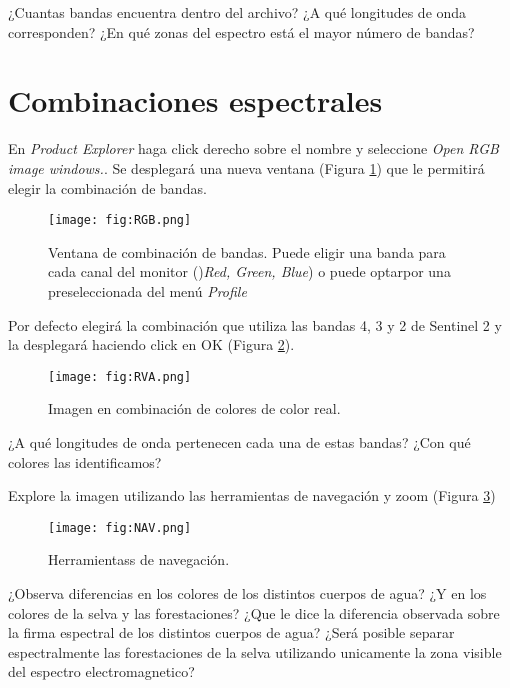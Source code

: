 \begin{que}
    ¿Cuantas bandas encuentra dentro del archivo? ¿A qué longitudes de onda corresponden? ¿En qué zonas del espectro está el mayor número de bandas?
\end{que}

\section{Combinaciones espectrales}

En \emph{Product Explorer} haga click derecho sobre el nombre y seleccione \emph{Open RGB image windows.}. Se desplegará una nueva ventana (Figura \ref{fig:RGB}) que le permitirá elegir la combinación de bandas.

\begin{figure}[h!]
    \centering
    \texttt{[image: fig:RGB.png]}
    \caption{Ventana de combinación de bandas. Puede eligir una banda para cada canal del monitor ()\emph{Red, Green, Blue}) o puede optarpor una preseleccionada del menú \emph{Profile}}
    \label{fig:RGB}
\end{figure}

Por defecto elegirá la combinación que utiliza las bandas 4, 3 y 2 de Sentinel 2 y la desplegará haciendo click en OK (Figura \ref{fig:RVA}).

\begin{figure}[h!]
    \centering
    \texttt{[image: fig:RVA.png]}
    \caption{Imagen en combinación de colores de color real.}
    \label{fig:RVA}
\end{figure}

\begin{que}
    ¿A qué longitudes de onda pertenecen cada una de estas bandas? ¿Con qué colores las identificamos?
\end{que}

Explore la imagen utilizando las herramientas de navegación y zoom (Figura \ref{fig:NAV})

\begin{figure}[h!]
    \centering
    \texttt{[image: fig:NAV.png]}
    \caption{Herramientass de navegación.}
    \label{fig:NAV}
\end{figure}



\begin{que}
    ¿Observa diferencias en los colores de los distintos cuerpos de agua? ¿Y en los colores de la selva y las forestaciones? ¿Que le dice la diferencia observada sobre la firma espectral de los distintos cuerpos de agua? ¿Será posible separar espectralmente las forestaciones de la selva utilizando unicamente la zona visible del espectro electromagnetico?
\end{que}

